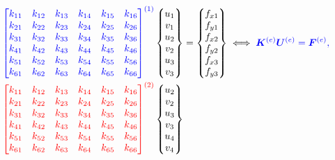 \begin{align}
    \color{blue} \begin{bmatrix}
        k_{11} & k_{12} & k_{13} & k_{14} & k_{15} & k_{16} \\
        k_{21} & k_{22} & k_{23} & k_{24} & k_{25} & k_{26} \\
        k_{31} & k_{32} & k_{33} & k_{34} & k_{35} & k_{36} \\
        k_{41} & k_{42} & k_{43} & k_{44} & k_{45} & k_{46} \\
        k_{51} & k_{52} & k_{53} & k_{54} & k_{55} & k_{56} \\
        k_{61} & k_{62} & k_{63} & k_{64} & k_{65} & k_{66} \\
    \end{bmatrix}^{(1)}
    \color{black}
    \begin{Bmatrix}
        u_1 \\ v_1 \\ u_2 \\ v_2 \\ u_3 \\ v_3
    \end{Bmatrix}
    &=
    \begin{Bmatrix}
        f_{x1} \\ f_{y1} \\ f_{x2} \\ f_{y2} \\ f_{x3} \\ f_{y3}
    \end{Bmatrix} \iff \color{blue} \bm{K}^{(e)} \bm{U}^{(e)} = \bm{F}^{(e)}, \\
    \color{red} \begin{bmatrix}
        k_{11} & k_{12} & k_{13} & k_{14} & k_{15} & k_{16} \\
        k_{21} & k_{22} & k_{23} & k_{24} & k_{25} & k_{26} \\
        k_{31} & k_{32} & k_{33} & k_{34} & k_{35} & k_{36} \\
        k_{41} & k_{42} & k_{43} & k_{44} & k_{45} & k_{46} \\
        k_{51} & k_{52} & k_{53} & k_{54} & k_{55} & k_{56} \\
        k_{61} & k_{62} & k_{63} & k_{64} & k_{65} & k_{66} \\
    \end{bmatrix}^{(2)}
    \color{black}
    \begin{Bmatrix}
        u_2 \\ v_2 \\ u_3 \\ v_3 \\ u_4 \\ v_4

\end{Bmatrix}
\end{align}
